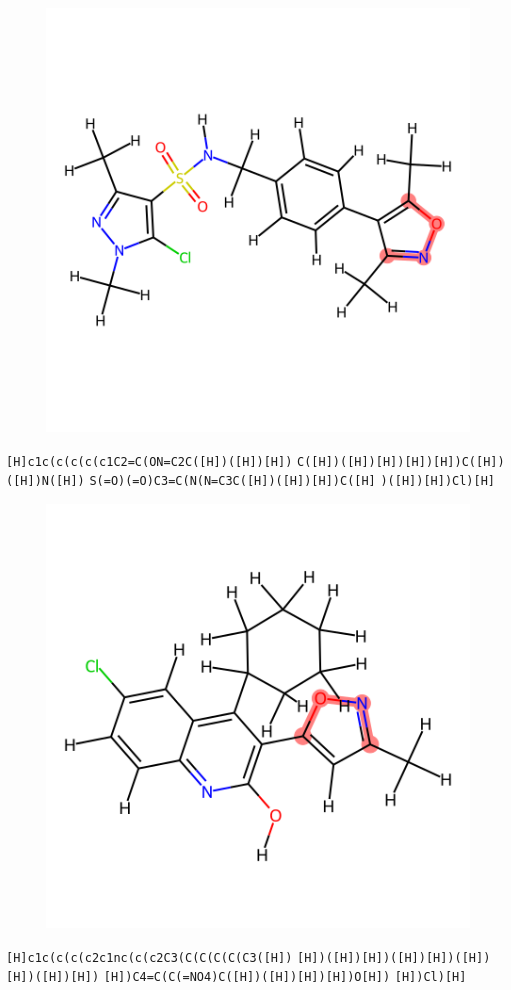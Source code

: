 \documentclass{article}
\begin{document}
\begin{figure}[ht]
\centering
    \includegraphics{mol268.png}
\end{figure}
\verb|[H]c1c(c(c(c(c1C2=C(ON=C2C([H])([H])[H])| \verb|C([H])([H])[H])[H])[H])C([H])([H])N([H])| \verb|S(=O)(=O)C3=C(N(N=C3C([H])([H])[H])C([H]| \verb|)([H])[H])Cl)[H]|

\begin{figure}[ht]
\centering
    \includegraphics{mol269.png}
\end{figure}
\verb|[H]c1c(c(c(c2c1nc(c(c2C3(C(C(C(C(C3([H])| \verb|[H])([H])[H])([H])[H])([H])[H])([H])[H])| \verb|[H])C4=C(C(=NO4)C([H])([H])[H])[H])O[H])| \verb|[H])Cl)[H]|
\end{document}
